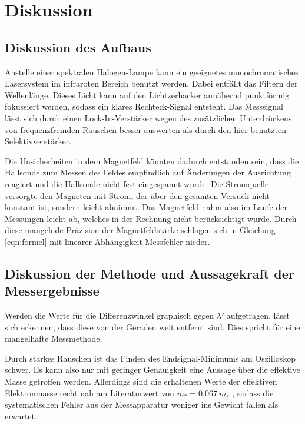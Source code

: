 \section{Diskussion}
\label{sec:Diskussion}
\subsection{Diskussion des Aufbaus}
Anstelle einer spektralen Halogen-Lampe kann ein geeignetes  monochromatisches Lasersystem im infraroten Bereich benutzt werden.
Dabei entfällt das Filtern der Wellenlänge.
Dieses Licht kann auf den Lichtzerhacker annähernd punktförmig fokussiert werden, sodass ein klares Rechteck-Signal entsteht.
Das Messsignal lässt sich durch einen Lock-In-Verstärker wegen des zusätzlichen Unterdrückens von frequenzfremden Rauschen besser auswerten als durch den hier benutzten Selektivverstärker.

Die Unsicherheiten in dem Magnetfeld könnten dadurch entstanden sein, dass die Hallsonde zum Messen des Feldes empfindlich auf Änderungen der Ausrichtung reagiert und die Hallsonde nicht fest eingespannt wurde.
Die Stromquelle versorgte den Magneten mit Strom, der über den gesamten Versuch nicht konstant ist, sondern leicht abnimmt.
Das Magnetfeld nahm also im Laufe der Messungen leicht ab, welches in der Rechnung nicht berücksichtigt wurde.
Durch diese mangelnde Präzision der Magnetfeldstärke schlagen sich in Gleichung \eqref{eqn:formel} mit linearer Abhängigkeit Messfehler nieder.

\subsection{Diskussion der Methode und Aussagekraft der Messergebnisse}
Werden die Werte für die Differenzwinkel graphisch gegen $\lambda²$ aufgetragen, lässt sich erkennen, dass diese von der Geraden weit entfernt sind. Dies spricht für eine mangelhafte Messmethode.

Durch starkes Rauschen ist das Finden des Endsignal-Minimums am Oszilloskop schwer. Es kann also nur mit geringer Genauigkeit eine Aussage über die effektive Masse getroffen werden.
Allerdings sind die erhaltenen Werte der effektiven Elektronmasse recht nah am Literaturwert von $m_* = \SI{0.067}{m_e}$ \cite{Hurensohn3}, sodass die systematischen Fehler aus der Messapparatur weniger ins Gewicht fallen als erwartet.
